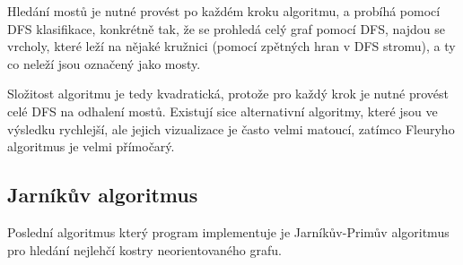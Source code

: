 \documentclass{article}
\begin{document}
Hledání mostů je nutné provést po každém kroku algoritmu, a probíhá
pomocí DFS klasifikace, konkrétně tak, že se prohledá celý graf pomocí
DFS, najdou se vrcholy, které leží na nějaké kružnici (pomocí zpětných
hran v DFS stromu), a ty co neleží jsou označený jako mosty.

Složitost algoritmu je tedy kvadratická, protože pro každý krok je nutné
provést celé DFS na odhalení mostů. Existují sice alternativní
algoritmy, které jsou ve výsledku rychlejší, ale jejich vizualizace je
často velmi matoucí, zatímco Fleuryho algoritmus je velmi přímočarý.

\subsection{Jarníkův algoritmus}

Poslední algoritmus který program implementuje je Jarníkův-Primův algoritmus
pro hledání nejlehčí kostry neorientovaného grafu.
\end{document}
